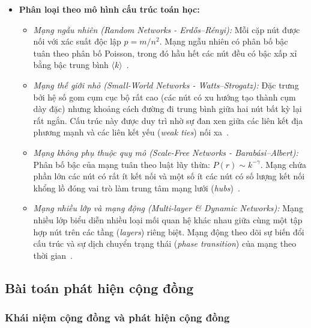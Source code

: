 \documentclass[14pt,a4paper]{extarticle}
\begin{document}
\begin{itemize}
    \item \textbf{Phân loại theo mô hình cấu trúc toán học:}
    \begin{itemize}
        \item \textit{Mạng ngẫu nhiên (Random Networks - Erd\H{o}s--R\'enyi):} Mỗi cặp nút được nối với xác suất độc lập $p = m/n^2$. Mạng ngẫu nhiên có phân bố bậc tuân theo phân bố Poisson, trong đó hầu hết các nút đều có bậc xấp xỉ bằng bậc trung bình $\langle k \rangle$~\cite{Traag2014}.
        \item \textit{Mạng thế giới nhỏ (Small-World Networks - Watts--Strogatz):} Đặc trưng bởi hệ số gom cụm cục bộ rất cao (các nút có xu hướng tạo thành cụm dày đặc) nhưng khoảng cách đường đi trung bình giữa hai nút bất kỳ lại rất ngắn. Cấu trúc này được duy trì nhờ sự đan xen giữa các liên kết địa phương mạnh và các liên kết yếu (\textit{weak ties}) nối xa~\cite{Scott2012}.
        \item \textit{Mạng không phụ thuộc quy mô (Scale-Free Networks - Barab\'asi--Albert):} Phân bố bậc của mạng tuân theo luật lũy thừa: $P(r) \sim k^{-\gamma}$. Mạng chứa phần lớn các nút có rất ít kết nối và một số ít các nút có số lượng kết nối khổng lồ đóng vai trò làm trung tâm mạng lưới (\textit{hubs})~\cite{Traag2014}.
        \item \textit{Mạng nhiều lớp và mạng động (Multi-layer \& Dynamic Networks):} Mạng nhiều lớp biểu diễn nhiều loại mối quan hệ khác nhau giữa cùng một tập hợp nút trên các tầng (\textit{layers}) riêng biệt. Mạng động theo dõi sự biến đổi cấu trúc và sự dịch chuyển trạng thái (\textit{phase transition}) của mạng theo thời gian~\cite{Traag2014, Scott2012}.
    \end{itemize}
\end{itemize}

\subsection{Bài toán phát hiện cộng đồng}

\subsubsection{Khái niệm cộng đồng và phát hiện cộng đồng}
\end{document}
